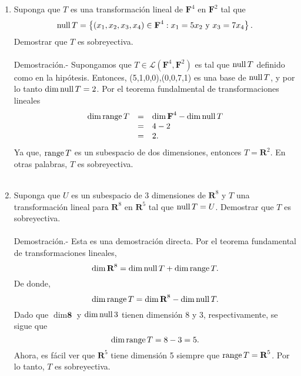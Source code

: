 \begin{enumerate}[\bfseries 1.]
    \item Suponga que $T$ es una transformación lineal de $\textbf{F}^4$ en $\textbf{F}^2$ tal que
    $$\operatorname{null} T = \left\{(x_1,x_2,x_3,x_4)\in \textbf{F}^4:x_1=5x_2 \mbox{ y } x_3=7x_4\right\}.$$
    Demostrar que $T$ es sobreyectiva.\\\\
	Demostración.-\; Supongamos que $T\in \mathcal{L}(\textbf{F}^4,\textbf{F}^2)$ es tal que $\operatorname{null} T$ definido como en la hipótesis. Entonces, (5,1,0,0),(0,0,7,1) es una base de $\operatorname{null} T$, y por lo tanto $\dim\operatorname{null} T = 2$. Por el teorema fundalmental de transformaciones lineales
	$$
	\begin{array}{rcl}	
	    \dim \operatorname{range} T &=& \dim \textbf{F}^4 - \dim \operatorname{null} T\\ 
			&=& 4-2\\
			&=& 2.
	\end{array}
	$$
	Ya que, $\operatorname{range} T$ es un subespacio de dos dimensiones, entonces $T=\textbf{R}^2$. En otras palabras, $T$ es sobreyectiva.\\\\

    \item Suponga que $U$ es un subespacio de 3 dimensiones de $\textbf{R}^8$ y  $T$ una transformación lineal para $\textbf{R}^8$ en $\textbf{R}^5$ tal que $\operatorname{null} T=U$. Demostrar que $T$ es sobreyectiva.\\\\
	Demostración.-\; Esta es una demostración directa. Por el teorema fundamental de transformaciones lineales,
	$$\dim \textbf{R}^8 = \dim \operatorname{null} T + \dim \operatorname{range} T.$$
	De donde,
	$$\dim \operatorname{range} T = \dim \textbf{R}^8 - \dim \operatorname{null} T.$$
	Dado que $\dim \textbf{8}$ y $\dim\operatorname{null} 3$ tienen dimensión 8 y 3, respectivamente, se sigue que
	$$\dim \operatorname{range} T = 8-3=5.$$
	Ahora, es fácil ver que $\textbf{R}^5$ tiene dimensión 5 siempre que $\operatorname{range} T=\textbf{R}^5$. Por lo tanto, $T$ es sobreyectiva.\\\\


\end{enumerate}
